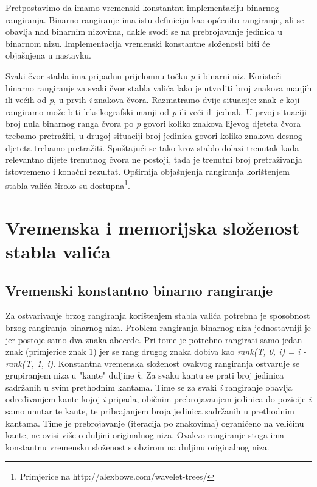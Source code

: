 \documentclass[times, utf8, seminar, numeric]{fer}
\begin{document}
Pretpostavimo da imamo
vremenski konstantnu implementaciju binarnog rangiranja. Binarno rangiranje ima
istu definiciju kao općenito rangiranje, ali se obavlja nad binarnim nizovima,
dakle svodi se na prebrojavanje jedinica u binarnom nizu. Implementacija
vremenski konstantne složenosti biti će objašnjena u nastavku. 

Svaki čvor stabla ima pripadnu prijelomnu točku \textit{p} i binarni niz.
Koristeći binarno rangiranje
za svaki čvor stabla valića lako je utvrditi broj znakova manjih ili većih
od \textit{p}, u prvih \textit{i} znakova čvora. Razmatramo dvije situacije:
znak \textit{c} koji rangiramo može biti leksikografski manji od \textit{p}
ili veći-ili-jednak. U prvoj situaciji broj nula binarnog ranga čvora po
\textit{p} govori koliko znakova lijevog djeteta čvora trebamo pretražiti,
u drugoj situaciji broj jedinica govori koliko znakova desnog djeteta trebamo
pretražiti. Spuštajući se tako kroz stablo dolazi trenutak kada relevantno
dijete trenutnog čvora ne postoji, tada je trenutni broj pretraživanja istovremeno
i konačni rezultat. Opširnija objašnjenja rangiranja korištenjem stabla valića
široko su dostupna\footnote{Primjerice na http://alexbowe.com/wavelet-trees/}.

\section{Vremenska i memorijska složenost stabla valića}

\subsection{Vremenski konstantno binarno rangiranje}

Za ostvarivanje brzog rangiranja korištenjem stabla valića potrebna je sposobnost
brzog rangiranja binarnog niza. Problem rangiranja binarnog niza jednostavniji
je jer postoje samo dva znaka abecede. Pri tome je potrebno rangirati samo jedan
znak (primjerice znak 1) jer se rang drugog znaka dobiva kao \textit{rank(T, 0, i)
= i - rank(T, 1, i)}. Konstantna vremenska složenost ovakvog rangiranja ostvaruje
se grupiranjem niza u "kante" duljine \textit{k}. Za svaku kantu se prati broj
jedinica sadržanih u svim prethodnim kantama. Time se za svaki \textit{i} rangiranje
obavlja određivanjem kante kojoj \textit{i} pripada, običnim prebrojavanjem jedinica
do pozicije \textit{i} samo unutar
te kante, te pribrajanjem broja jedinica sadržanih u prethodnim kantama. Time je
prebrojavanje (iteracija po znakovima) ograničeno na veličinu kante, ne ovisi više
o duljini originalnog niza. Ovakvo rangiranje stoga ima konstantnu vremensku složenost s obzirom
na duljinu originalnog niza.
\end{document}
